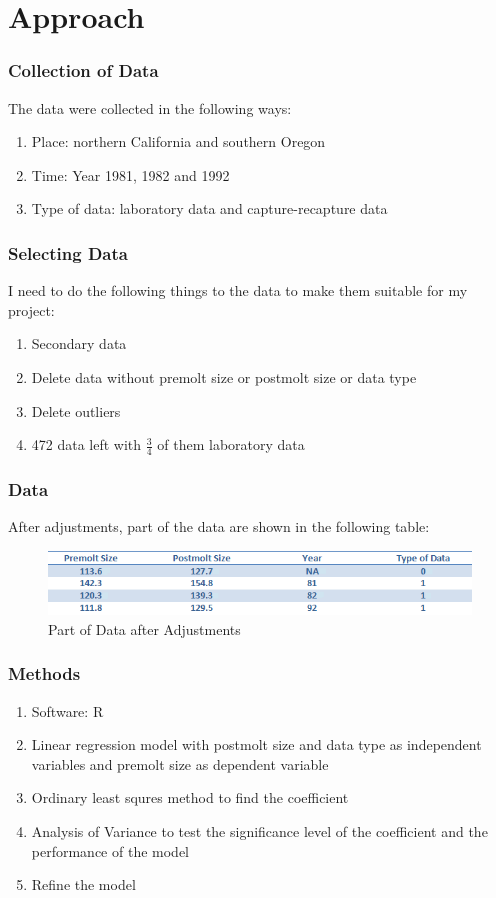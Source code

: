 \documentclass[compress,handout,10pt]{beamer}
\let\olditem\item
\renewcommand{\item}{\setlength{\itemsep}{0.5\baselineskip}\olditem}
\begin{document}
\section{Approach}
\begin{frame}
    \frametitle{Collection of Data}
    The data were collected in the following ways:
     \begin{enumerate}
         \item Place: northern California and southern Oregon
         \item Time: Year 1981, 1982 and 1992
         \item Type of data: laboratory data and capture-recapture data
     \end{enumerate}
\end{frame}

\begin{frame}
    \frametitle{Selecting Data}
    I need to do the following things to the data to make them suitable for my project:
     \begin{enumerate}
         \item Secondary data
         \item Delete data without premolt size or postmolt size or data type
         \item Delete outliers
         \item 472 data left with $\frac{3}{4}$ of them laboratory data
     \end{enumerate}
\end{frame}

\begin{frame}
    \frametitle{Data}
    After adjustments, part of the data are shown in the following table:
    \begin{figure}
        \begin{center}
	    \includegraphics[width=\textwidth]{data.png}
	\end{center}
	\caption{Part of Data after Adjustments}
    \end{figure}
\end{frame}

\begin{frame}
    \frametitle{Methods}
     \begin{enumerate}
         \item Software: R
         \item Linear regression model with postmolt size and data type as independent variables and premolt size as dependent variable
         \item Ordinary least squres method to find the coefficient
         \item Analysis of Variance to test the significance level of the coefficient and the performance of the model
         \item Refine the model
     \end{enumerate}
\end{frame}
\end{document}

